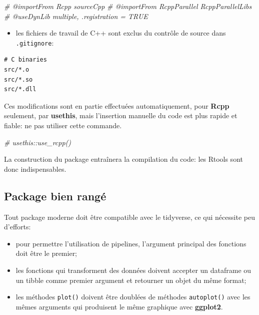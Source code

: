 \documentclass[
  12pt,
  french,
  a4paper,
  extrafontsizes,onecolumn,openright
  ]{memoir}
\newenvironment{Shaded}{\begin{snugshade}}{\end{snugshade}}
\newcommand{\CommentTok}[1]{\textcolor[rgb]{0.56,0.35,0.01}{\textit{#1}}}
\providecommand{\tightlist}{%
  \setlength{\itemsep}{0pt}\setlength{\parskip}{0pt}}
\begin{document}
\scriptsize

\begin{Shaded}
\begin{Highlighting}[]
\CommentTok{\#\textquotesingle{} @importFrom Rcpp sourceCpp}
\CommentTok{\#\textquotesingle{} @importFrom RcppParallel RcppParallelLibs}
\CommentTok{\#\textquotesingle{} @useDynLib multiple, .registration = TRUE}
\end{Highlighting}
\end{Shaded}

\normalsize

\begin{itemize}
\tightlist
\item
  les fichiers de travail de C++ sont exclus du contrôle de source dans \texttt{.gitignore}:
\end{itemize}

\begin{verbatim}
# C binaries
src/*.o
src/*.so
src/*.dll
\end{verbatim}

Ces modifications sont en partie effectuées automatiquement, pour \textbf{Rcpp} seulement, par \textbf{usethis}, mais l'insertion manuelle du code est plus rapide et fiable: ne pas utiliser cette commande.

\scriptsize

\begin{Shaded}
\begin{Highlighting}[]
\CommentTok{\# usethis::use\_rcpp()}
\end{Highlighting}
\end{Shaded}

\normalsize

La construction du package entraînera la compilation du code: les Rtools sont donc indispensables.

\subsection{Package bien rangé}\label{package-bien-ranguxe9}

Tout package moderne doit être compatible avec le tidyverse, ce qui nécessite peu d'efforts:

\begin{itemize}
\tightlist
\item
  pour permettre l'utilisation de pipelines, l'argument principal des fonctions doit être le premier;
\item
  les fonctions qui transforment des données doivent accepter un dataframe ou un tibble comme premier argument et retourner un objet du même format;
\item
  les méthodes \texttt{plot()} doivent être doublées de méthodes \texttt{autoplot()} avec les mêmes arguments qui produisent le même graphique avec \textbf{ggplot2}.
\end{itemize}
\end{document}
